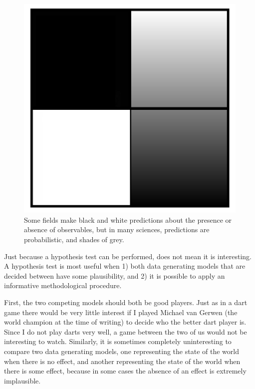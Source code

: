 \documentclass[
  oneside]{krantz}
\begin{document}
\begin{figure}

{\centering \includegraphics[width=1\linewidth]{images/blackwhite} 

}

\caption{Some fields make black and white predictions about the presence or absence of observables, but in many sciences, predictions are probabilistic, and shades of grey.}\label{fig:blackwhite}
\end{figure}

Just because a hypothesis test can be performed, does not mean it is interesting. A hypothesis test is most useful when 1) both data generating models that are decided between have some plausibility, and 2) it is possible to apply an informative methodological procedure.

First, the two competing models should both be good players. Just as in a dart game there would be very little interest if I played Michael van Gerwen (the world champion at the time of writing) to decide who the better dart player is. Since I do not play darts very well, a game between the two of us would not be interesting to watch. Similarly, it is sometimes completely uninteresting to compare two data generating models, one representing the state of the world when there is no effect, and another representing the state of the world when there is some effect, because in some cases the absence of an effect is extremely implausible.
\end{document}
